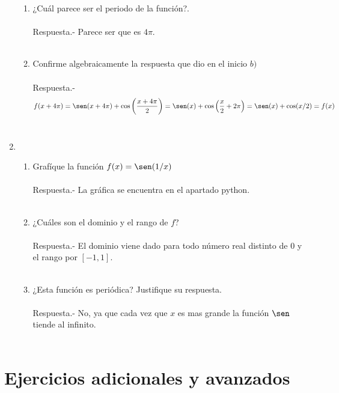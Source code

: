 \begin{enumerate}
\begin{enumerate}[\bfseries a)]
    \item ¿Cuál parece ser el periodo de la función?.\\\\
	Respuesta.-\; Parece ser que es $4\pi$.\\\\

    \item Confirme algebraicamente la respuesta que dio en el inicio $b)$\\\\
	Respuesta.-\; $$f(x+4\pi) = \sen(x+4\pi) + \cos \left(\dfrac{x+4\pi}{2}\right) = \sen(x) + \cos \left(\dfrac{x}{2} + 2\pi\right) = \sen(x) + \cos(x/2) = f(x)$$\\

\end{enumerate}

\item 
\begin{enumerate}[\bfseries a)]

    \item Grafíque la función $f(x) = \sen (1/x)$\\\\ 
	Respuesta.-\; La gráfica se encuentra en el apartado python.\\\\

    \item ¿Cuáles son el dominio y el rango de $f$?\\\\
	Respuesta.-\; El dominio viene dado para todo número real distinto de $0$ y el rango por $[-1,1]$.\\\\ 

    \item ¿Esta función es periódica? Justifique su respuesta.\\\\
	Respuesta.-\; No, ya que cada vez que $x$ es mas grande la función $\sen$ tiende al infinito.\\\\ 

\end{enumerate}

\end{enumerate}



\section{Ejercicios adicionales y avanzados}
 
